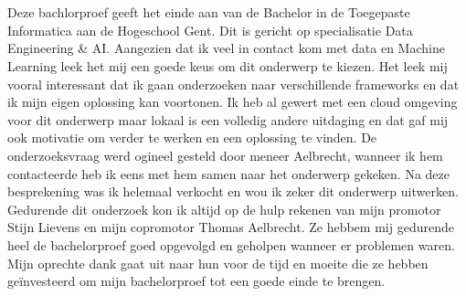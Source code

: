 
\chapter*{}%
\label{ch:voorwoord}
Deze bachlorproef geeft het einde aan van de Bachelor in de Toegepaste Informatica aan de Hogeschool Gent. Dit is gericht op specialisatie Data Engineering \& AI. Aangezien dat ik veel in contact kom met data en Machine Learning leek het mij een goede keus om dit onderwerp te kiezen. Het leek mij vooral interessant dat ik gaan onderzoeken naar verschillende frameworks en dat ik mijn eigen oplossing kan voortonen.
Ik heb al gewert met een cloud omgeving voor dit onderwerp maar lokaal is een volledig andere uitdaging en dat gaf mij ook motivatie om verder te werken en een oplossing te vinden. De onderzoeksvraag werd ogineel gesteld door meneer Aelbrecht, wanneer ik hem contacteerde heb ik eens met hem samen naar het onderwerp gekeken.
Na deze besprekening was ik helemaal verkocht en wou ik zeker dit onderwerp uitwerken. Gedurende dit onderzoek kon ik altijd op de hulp rekenen van mijn promotor Stijn Lievens en mijn copromotor Thomas Aelbrecht. Ze hebbem mij gedurende heel de bachelorproef goed opgevolgd en geholpen wanneer er problemen waren. Mijn oprechte dank gaat uit naar hun voor de tijd en moeite die ze hebben geïnvesteerd om mijn bachelorproef tot een goede einde te brengen.
